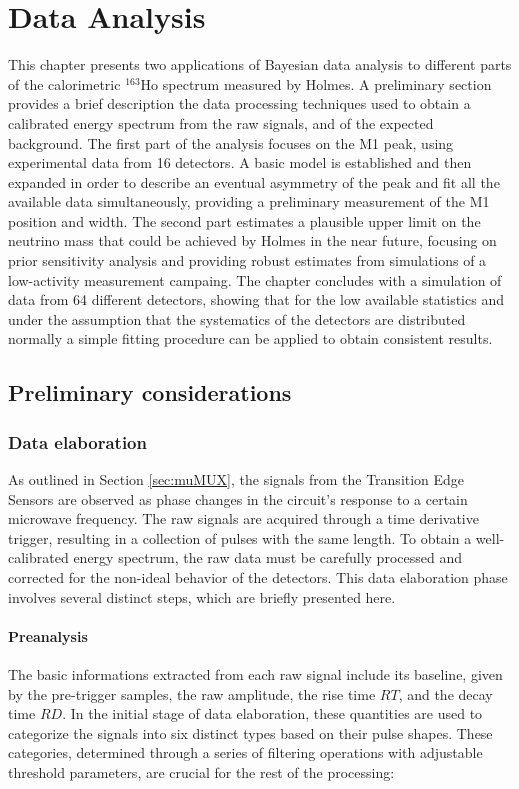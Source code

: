 \chapter{Data Analysis}
This chapter presents two applications of Bayesian data analysis to different parts of the calorimetric $^{163}$Ho spectrum measured
by Holmes. A preliminary section provides a brief description the data processing techniques used to obtain a
calibrated energy spectrum from the raw signals, and of the expected background. The first part of the
analysis focuses on the M1 peak, using experimental data from 16 detectors. A basic
model is established and then expanded in order to describe an eventual asymmetry of the peak and fit all the available
data simultaneously, providing a preliminary measurement of the M1 position and width. The second part estimates a
plausible upper limit on the neutrino mass that could be achieved by Holmes in the near future, focusing on prior
sensitivity analysis and providing robust estimates from simulations of a low-activity measurement campaing. The chapter
concludes with a simulation of data from 64 different detectors, showing that for the low available statistics and under
the assumption that the systematics of the detectors are distributed normally a simple fitting procedure can be
applied to obtain consistent results.
\section{Preliminary considerations}
\subsection{Data elaboration}
As outlined in Section \ref{sec:muMUX}, the signals from the Transition Edge Sensors are observed as phase changes in the circuit's response to a certain microwave frequency. The raw signals are acquired through a time derivative trigger, resulting in a collection of pulses with the same length. To obtain a well-calibrated energy spectrum, the raw data must be carefully processed and corrected for the non-ideal behavior of the detectors. This data elaboration phase involves several distinct steps, which are briefly presented here.

\subsubsection*{Preanalysis}
The basic informations extracted from each raw signal include its baseline, given by the pre-trigger samples, the raw
amplitude, the rise time $RT$, and the decay time $RD$. In the initial stage of data elaboration, these quantities are
used to categorize the signals into six distinct types based on their pulse shapes. These categories, determined through
a series of filtering operations with adjustable threshold parameters, are crucial for the rest of the processing:

